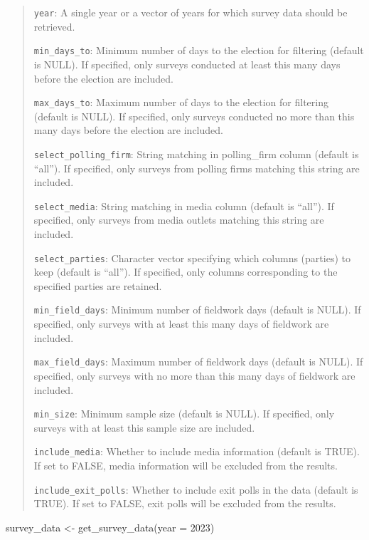 \documentclass[
  letterpaper,
  DIV=11,
  numbers=noendperiod]{scrreprt}
\newenvironment{Shaded}{\begin{snugshade}}{\end{snugshade}}
\newcommand{\AttributeTok}[1]{\textcolor[rgb]{0.40,0.45,0.13}{#1}}
\newcommand{\DecValTok}[1]{\textcolor[rgb]{0.68,0.00,0.00}{#1}}
\newcommand{\FunctionTok}[1]{\textcolor[rgb]{0.28,0.35,0.67}{#1}}
\newcommand{\NormalTok}[1]{\textcolor[rgb]{0.00,0.23,0.31}{#1}}
\newcommand{\OtherTok}[1]{\textcolor[rgb]{0.00,0.23,0.31}{#1}}
\begin{document}
\begin{quote}
\texttt{year}: A single year or a vector of years for which survey data
should be retrieved.

\texttt{min\_days\_to}: Minimum number of days to the election for
filtering (default is NULL). If specified, only surveys conducted at
least this many days before the election are included.

\texttt{max\_days\_to}: Maximum number of days to the election for
filtering (default is NULL). If specified, only surveys conducted no
more than this many days before the election are included.

\texttt{select\_polling\_firm}: String matching in polling\_firm column
(default is ``all''). If specified, only surveys from polling firms
matching this string are included.

\texttt{select\_media}: String matching in media column (default is
``all''). If specified, only surveys from media outlets matching this
string are included.

\texttt{select\_parties}: Character vector specifying which columns
(parties) to keep (default is ``all''). If specified, only columns
corresponding to the specified parties are retained.

\texttt{min\_field\_days}: Minimum number of fieldwork days (default is
NULL). If specified, only surveys with at least this many days of
fieldwork are included.

\texttt{max\_field\_days}: Maximum number of fieldwork days (default is
NULL). If specified, only surveys with no more than this many days of
fieldwork are included.

\texttt{min\_size}: Minimum sample size (default is NULL). If specified,
only surveys with at least this sample size are included.

\texttt{include\_media}: Whether to include media information (default
is TRUE). If set to FALSE, media information will be excluded from the
results.

\texttt{include\_exit\_polls}: Whether to include exit polls in the data
(default is TRUE). If set to FALSE, exit polls will be excluded from the
results.
\end{quote}

\begin{Shaded}
\begin{Highlighting}[]
\NormalTok{survey\_data }\OtherTok{\textless{}{-}} \FunctionTok{get\_survey\_data}\NormalTok{(}\AttributeTok{year =} \DecValTok{2023}\NormalTok{)}
\end{Highlighting}
\end{Shaded}
\end{document}
